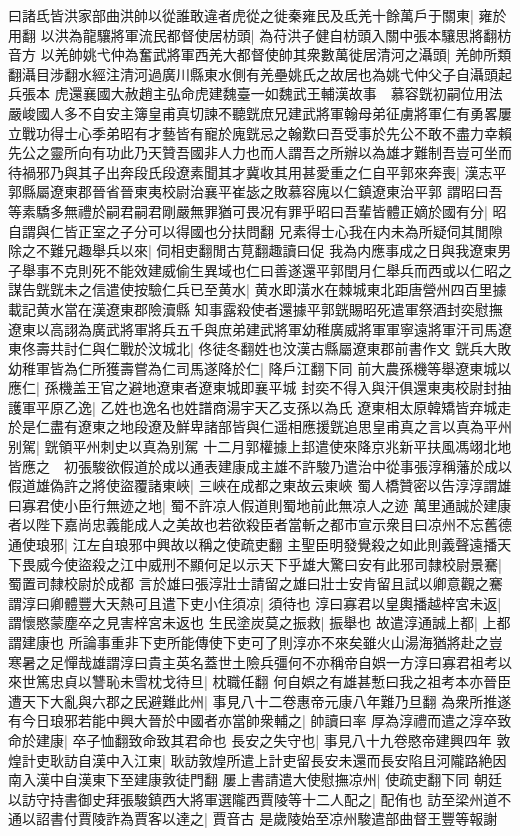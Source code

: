 曰諸氐皆洪家部曲洪帥以從誰敢違者虎從之徙秦雍民及氐羌十餘萬戶于關東|{
	雍於用翻}
以洪為龍驤將軍流民都督使居枋頭|{
	為苻洪子健自枋頭入關中張本驤思將翻枋音方}
以羌帥姚弋仲為奮武將軍西羌大都督使帥其衆數萬徙居清河之灄頭|{
	羌帥所類翻灄目涉翻水經注清河過廣川縣東水側有羌壘姚氏之故居也為姚弋仲父子自灄頭起兵張本}
虎還襄國大赦趙主弘命虎建魏臺一如魏武王輔漢故事　慕容皝初嗣位用法嚴峻國人多不自安主簿皇甫真切諫不聽皝庶兄建武將軍翰母弟征虜將軍仁有勇畧屢立戰功得士心季弟昭有才藝皆有寵於廆皝忌之翰歎曰吾受事於先公不敢不盡力幸賴先公之靈所向有功此乃天贊吾國非人力也而人謂吾之所辦以為雄才難制吾豈可坐而待禍邪乃與其子出奔段氏段遼素聞其才冀收其用甚愛重之仁自平郭來奔喪|{
	漢志平郭縣屬遼東郡晉省晉東夷校尉治襄平崔毖之敗慕容廆以仁鎮遼東治平郭}
謂昭曰吾等素驕多無禮於嗣君嗣君剛嚴無罪猶可畏况有罪乎昭曰吾輩皆體正嫡於國有分|{
	昭自謂與仁皆正室之子分可以得國也分扶問翻}
兄素得士心我在内未為所疑伺其閒隙除之不難兄趣舉兵以來|{
	伺相吏翻閒古莧翻趣讀曰促}
我為内應事成之日與我遼東男子舉事不克則死不能效建威偷生異域也仁曰善遂還平郭閏月仁舉兵而西或以仁昭之謀告皝皝未之信遣使按驗仁兵已至黄水|{
	黄水即潢水在棘城東北距唐營州四百里據載記黄水當在漢遼東郡險瀆縣}
知事露殺使者還據平郭皝賜昭死遣軍祭酒封奕慰撫遼東以高詡為廣武將軍將兵五千與庶弟建武將軍幼稚廣威將軍軍寧遠將軍汗司馬遼東佟壽共討仁與仁戰於汶城北|{
	佟徒冬翻姓也汶漢古縣屬遼東郡前書作文}
皝兵大敗幼稚軍皆為仁所獲壽嘗為仁司馬遂降於仁|{
	降戶江翻下同}
前大農孫機等舉遼東城以應仁|{
	孫機盖王官之避地遼東者遼東城即襄平城}
封奕不得入與汗俱還東夷校尉封抽護軍平原乙逸|{
	乙姓也逸名也姓譜商湯宇天乙支孫以為氏}
遼東相太原韓矯皆弃城走於是仁盡有遼東之地段遼及鮮卑諸部皆與仁遥相應援皝追思皇甫真之言以真為平州别駕|{
	皝領平州刺史以真為别駕}
十二月郭權據上邽遣使來降京兆新平扶風馮翊北地皆應之　初張駿欲假道於成以通表建康成主雄不許駿乃遣治中從事張淳稱藩於成以假道雄偽許之將使盜覆諸東峽|{
	三峽在成都之東故云東峽}
蜀人橋贊密以告淳淳謂雄曰寡君使小臣行無迹之地|{
	蜀不許凉人假道則蜀地前此無凉人之迹}
萬里通誠於建康者以陛下嘉尚忠義能成人之美故也若欲殺臣者當斬之都市宣示衆目曰凉州不忘舊德通使琅邪|{
	江左自琅邪中興故以稱之使疏吏翻}
主聖臣明發覺殺之如此則義聲遠播天下畏威今使盜殺之江中威刑不顯何足以示天下乎雄大驚曰安有此邪司隸校尉景騫|{
	蜀置司隸校尉於成都}
言於雄曰張淳壯士請留之雄曰壯士安肯留且試以卿意觀之騫謂淳曰卿體豐大天熱可且遣下吏小住須凉|{
	須待也}
淳曰寡君以皇輿播越梓宮未返|{
	謂懷愍蒙塵卒之見害梓宮未返也}
生民塗炭莫之振救|{
	振舉也}
故遣淳通誠上都|{
	上都謂建康也}
所論事重非下吏所能傳使下吏可了則淳亦不來矣雖火山湯海猶將赴之豈寒暑之足憚哉雄謂淳曰貴主英名蓋世土險兵彊何不亦稱帝自娯一方淳曰寡君祖考以來世篤忠貞以讐恥未雪枕戈待旦|{
	枕職任翻}
何自娯之有雄甚慙曰我之祖考本亦晉臣遭天下大亂與六郡之民避難此州|{
	事見八十二卷惠帝元康八年難乃旦翻}
為衆所推遂有今日琅邪若能中興大晉於中國者亦當帥衆輔之|{
	帥讀曰率}
厚為淳禮而遣之淳卒致命於建康|{
	卒子恤翻致命致其君命也}
長安之失守也|{
	事見八十九卷愍帝建興四年}
敦煌計吏耿訪自漢中入江東|{
	耿訪敦煌所遣上計吏留長安未還而長安陷且河隴路絶因南入漢中自漢東下至建康敦徒門翻}
屢上書請遣大使慰撫凉州|{
	使疏吏翻下同}
朝廷以訪守持書御史拜張駿鎮西大將軍選隴西賈陵等十二人配之|{
	配侑也}
訪至梁州道不通以詔書付賈陵詐為賈客以達之|{
	賈音古}
是歲陵始至凉州駿遣部曲督王豐等報謝

